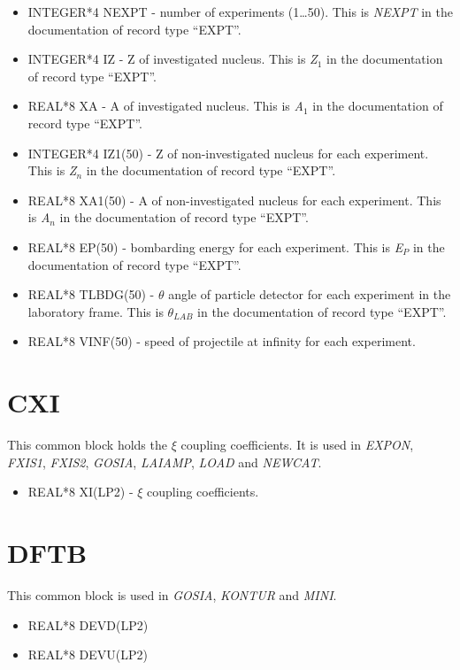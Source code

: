 \begin{itemize}
\item INTEGER*4 NEXPT - number of experiments (1{\ldots}50). This is \emph{
NEXPT} in the documentation of record type ``EXPT''.
\item INTEGER*4 IZ - Z of investigated nucleus. This is \emph{Z$_1$} in the
documentation of record type ``EXPT''.
\item REAL*8 XA - A of investigated nucleus. This is \emph{A$_1$} in the
documentation of record type ``EXPT''.
\item INTEGER*4 IZ1(50) - Z of non-investigated nucleus for each experiment.
This is \emph{Z$_n$} in the documentation of record type ``EXPT''.
\item REAL*8 XA1(50) - A of non-investigated nucleus for each experiment.
This is \emph{A$_n$} in the documentation of record type ``EXPT''.
\item REAL*8 EP(50) - bombarding energy for each experiment. This is \emph{
E$_P$} in the documentation of record type ``EXPT''.
\item REAL*8 TLBDG(50) - $\theta$ angle of particle detector for each
experiment in the laboratory frame. This is \emph{$\theta_{LAB}$} in the
documentation of record type ``EXPT''.
\item REAL*8 VINF(50) - speed of projectile at infinity for each experiment.
\end{itemize}

\section{CXI}

This common block holds the $\xi$ coupling coefficients. It is used in \emph{
EXPON}, \emph{FXIS1}, \emph{FXIS2}, \emph{GOSIA}, \emph{LAIAMP}, \emph{LOAD} and
\emph{NEWCAT}.

\begin{itemize}
\item REAL*8 XI(LP2) - $\xi$ coupling coefficients.
\end{itemize}

\section{DFTB}

This common block is used in \emph{GOSIA}, \emph{KONTUR} and \emph{MINI}.

\begin{itemize}
\item REAL*8 DEVD(LP2)
\item REAL*8 DEVU(LP2)
\end{itemize}

